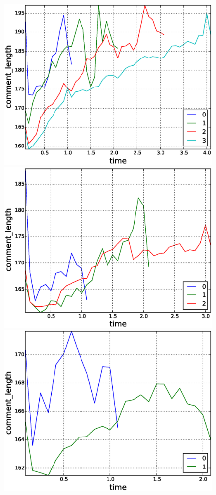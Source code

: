 \begin{figure}[!tb]
\includegraphics[scale=0.2]{./images/avr_comment_length_for_surviving_year_for_2011.eps}
\includegraphics[scale=0.2]{./images/avr_comment_length_for_surviving_year_for_2012.eps}
\includegraphics[scale=0.2]{./images/avr_comment_length_for_surviving_year_for_2013.eps}

\end{figure}
